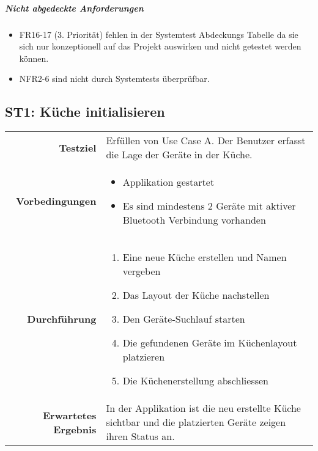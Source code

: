 
\subparagraph{Nicht abgedeckte Anforderungen}
\begin{itemize}
\item \ac{FR}16-17 (3. Priorität) fehlen in der Systemtest Abdeckungs Tabelle da sie sich nur konzeptionell auf das Projekt auswirken und nicht getestet werden können.
\item \ac{NFR}2-6 sind nicht durch Systemtests überprüfbar.
\end{itemize}

\subsection{ST1: Küche initialisieren}
\begin{table}[H]
\begin{tabularx}{\textwidth}{r X }
\textbf{Testziel} & Erfüllen von Use Case A. Der Benutzer erfasst die Lage der Geräte in der Küche. \\
\textbf{Vorbedingungen} & \begin{itemize}
\item Applikation gestartet
\item Es sind mindestens 2 Geräte mit aktiver Bluetooth Verbindung vorhanden
\end{itemize} \\
\textbf{Durchführung} & \begin{enumerate}
\item Eine neue Küche erstellen und Namen vergeben
\item Das Layout der Küche nachstellen
\item Den Geräte-Suchlauf starten
\item Die gefundenen Geräte im Küchenlayout platzieren
\item Die Küchenerstellung abschliessen
\end{enumerate} \\
\textbf{Erwartetes Ergebnis} & In der Applikation ist die neu erstellte Küche sichtbar und die platzierten Geräte zeigen ihren Status an.\\
\end{tabularx}
\end{table}

